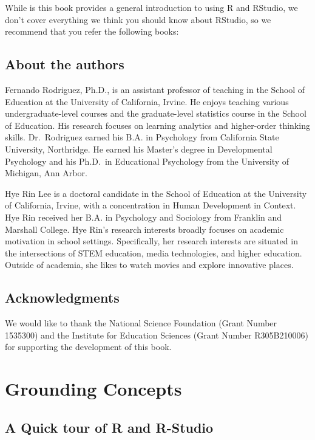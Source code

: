 \documentclass[
]{book}
\begin{document}
While is this book provides a general introduction to using R and RStudio, we don't cover everything we think you should know about RStudio, so we recommend that you refer the following books:

\hypertarget{about-the-authors}{%
\section{About the authors}\label{about-the-authors}}

Fernando Rodriguez, Ph.D., is an assistant professor of teaching in the School of Education at the University of California, Irvine. He enjoys teaching various undergraduate-level courses and the graduate-level statistics course in the School of Education. His research focuses on learning analytics and higher-order thinking skills. Dr.~Rodriguez earned his B.A. in Psychology from California State University, Northridge. He earned his Master's degree in Developmental Psychology and his Ph.D.~in Educational Psychology from the University of Michigan, Ann Arbor.

Hye Rin Lee is a doctoral candidate in the School of Education at the University of California, Irvine, with a concentration in Human Development in Context. Hye Rin received her B.A. in Psychology and Sociology from Franklin and Marshall College. Hye Rin's research interests broadly focuses on academic motivation in school settings. Specifically, her research interests are situated in the intersections of STEM education, media technologies, and higher education. Outside of academia, she likes to watch movies and explore innovative places.

\hypertarget{acknowledgments}{%
\section{Acknowledgments}\label{acknowledgments}}

We would like to thank the National Science Foundation (Grant Number 1535300) and the Institute for Education Sciences (Grant Number R305B210006) for supporting the development of this book.

\hypertarget{grounding-concepts}{%
\chapter{Grounding Concepts}\label{grounding-concepts}}

\hypertarget{a-quick-tour-of-r-and-r-studio}{%
\section{A Quick tour of R and R-Studio}\label{a-quick-tour-of-r-and-r-studio}}
\end{document}
